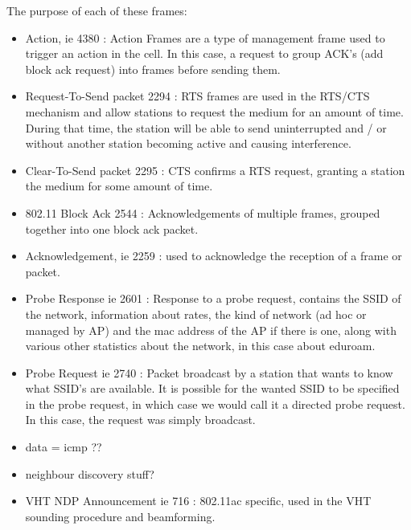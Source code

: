The purpose of each of these frames:
\begin{itemize}
\item Action, ie 4380 : Action Frames are a type of  management frame used to trigger an action in the cell. In this case, a request to group ACK's (add block ack request) into frames before sending them.
\item Request-To-Send packet 2294 : RTS frames are used in the RTS/CTS mechanism and allow stations to request the medium for an amount of time. During that time, the station will be able to send uninterrupted and / or without another station becoming active and causing interference.
\item Clear-To-Send packet 2295 : CTS confirms a RTS request, granting a station the medium for some amount of time.
\item 802.11 Block Ack 2544 : Acknowledgements of multiple frames, grouped together into one block ack packet.
\item Acknowledgement, ie 2259 : used to acknowledge the reception of a frame or packet.
\item Probe Response ie 2601 : Response to a probe request, contains the SSID of the network, information about rates, the kind of network (ad hoc or managed by AP) and the mac address of the AP if there is one, along with various other statistics about the network, in this case about eduroam.
\item Probe Request ie 2740 : Packet broadcast by a station that wants to know what SSID's are available. It is possible for the wanted SSID to be specified in the probe request, in which case we would call it a directed probe request. In this case, the request was simply broadcast.
\item data = icmp ??
\item neighbour discovery stuff?
\item VHT NDP Announcement ie 716 : 802.11ac specific, used in the VHT sounding procedure and beamforming.
\end{itemize}

